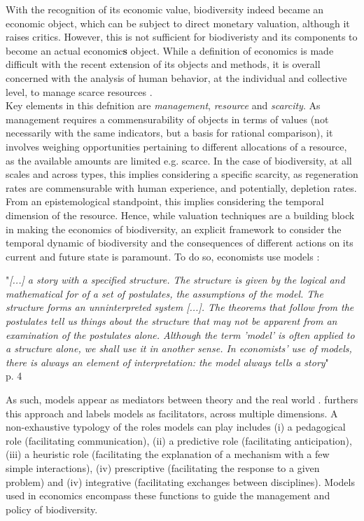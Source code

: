 With the recognition of its economic value, biodiversity indeed became an economic object, which can be subject to direct monetary valuation, although it raises critics. However, this is not sufficient for biodiveristy and its components to become an actual economic\textbf{s} object. While a definition of economics is made difficult with the recent extension of its objects and methods, it is overall concerned with the analysis of human behavior, at the individual and collective level, to manage scarce resources \citep{mankiw_principles_2011, bade_foundations_2002,backhouse_retrospectives_2009}.\\
Key elements in this defnition are \textit{management}, \textit{resource }and \textit{scarcity}. As management requires a commensurability of objects in terms of values (not necessarily with the same indicators, but a basis for rational comparison), it involves weighing opportunities pertaining to different allocations of a resource, as the available amounts are limited e.g. scarce. In the case of biodiversity, at all scales and across types, this implies considering a specific scarcity, as regeneration rates are commensurable with human experience, and potentially, depletion rates. From an epistemological standpoint, this implies considering the temporal dimension of the resource. Hence, while valuation techniques are a building block in making the economics of biodiversity, an explicit framework to consider the temporal dynamic of biodiversity and the consequences of different actions on its current and future state is paramount. To do so, economists use models : 

\begin{displayquote}
 "\textit{[...] a story with a specified structure. The structure is given by the logical and mathematical for of a set of postulates, the assumptions of the model. The structure forms an unninterpreted system [...]. The theorems that follow from the postulates tell us things about the structure that may not be apparent from an examination of the postulates alone. Although the term 'model' is often applied to a structure alone, we shall use it in another sense. In economists' use of models, there is always an element of interpretation: the model always tells a story}"\\
\hspace*{\fill} \small{\cite{GibbardVarian} p. 4}
\end{displayquote}

As such, models appear as mediators between theory and the real world \citep{morgan_models_2009}. \cite{varenne_epistemologie_2014} furthers this approach and labels models as facilitators, across multiple dimensions. A non-exhaustive typology of the roles models can play includes (i) a pedagogical role (facilitating communication), (ii) a predictive role (facilitating anticipation), (iii) a heuristic role (facilitating the explanation of a mechanism with a few simple interactions), (iv) prescriptive (facilitating the response to a given problem) and (iv) integrative (facilitating exchanges between disciplines). Models used in economics encompass these functions to guide the management and policy of biodiversity. 


